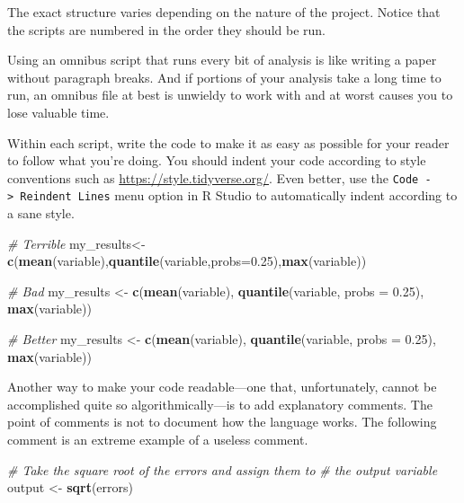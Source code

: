 \documentclass[
  12pt,
  oneside,openany]{book}
\newenvironment{Shaded}{\begin{snugshade}}{\end{snugshade}}
\newcommand{\CommentTok}[1]{\textcolor[rgb]{0.56,0.35,0.01}{\textit{#1}}}
\newcommand{\DataTypeTok}[1]{\textcolor[rgb]{0.13,0.29,0.53}{#1}}
\newcommand{\FloatTok}[1]{\textcolor[rgb]{0.00,0.00,0.81}{#1}}
\newcommand{\KeywordTok}[1]{\textcolor[rgb]{0.13,0.29,0.53}{\textbf{#1}}}
\newcommand{\NormalTok}[1]{#1}
\newcommand{\StringTok}[1]{\textcolor[rgb]{0.31,0.60,0.02}{#1}}
\begin{document}
The exact structure varies depending on the nature of the project. Notice that the scripts are numbered in the order they should be run.

Using an omnibus script that runs every bit of analysis is like writing a paper without paragraph breaks. And if portions of your analysis take a long time to run, an omnibus file at best is unwieldy to work with and at worst causes you to lose valuable time.

Within each script, write the code to make it as easy as possible for your reader to follow what you're doing. You should indent your code according to style conventions such as \url{https://style.tidyverse.org/}. Even better, use the \texttt{Code\ -\textgreater{}\ Reindent\ Lines} menu option in R Studio to automatically indent according to a sane style.

\begin{Shaded}
\begin{Highlighting}[]
\CommentTok{\# Terrible}
\NormalTok{my\_results\textless{}{-}}\KeywordTok{c}\NormalTok{(}\KeywordTok{mean}\NormalTok{(variable),}\KeywordTok{quantile}\NormalTok{(variable,}\DataTypeTok{probs=}\FloatTok{0.25}\NormalTok{),}\KeywordTok{max}\NormalTok{(variable))}

\CommentTok{\# Bad}
\NormalTok{my\_results \textless{}{-}}\StringTok{ }\KeywordTok{c}\NormalTok{(}\KeywordTok{mean}\NormalTok{(variable),}
\KeywordTok{quantile}\NormalTok{(variable,}
\DataTypeTok{probs =} \FloatTok{0.25}\NormalTok{),}
\KeywordTok{max}\NormalTok{(variable))}

\CommentTok{\# Better}
\NormalTok{my\_results \textless{}{-}}\StringTok{ }\KeywordTok{c}\NormalTok{(}\KeywordTok{mean}\NormalTok{(variable),}
                \KeywordTok{quantile}\NormalTok{(variable,}
                         \DataTypeTok{probs =} \FloatTok{0.25}\NormalTok{),}
                \KeywordTok{max}\NormalTok{(variable))}
\end{Highlighting}
\end{Shaded}

Another way to make your code readable---one that, unfortunately, cannot be accomplished quite so algorithmically---is to add explanatory comments. The point of comments is not to document how the language works. The following comment is an extreme example of a useless comment.

\begin{Shaded}
\begin{Highlighting}[]
\CommentTok{\# Take the square root of the errors and assign them to}
\CommentTok{\# the output variable}
\NormalTok{output \textless{}{-}}\StringTok{ }\KeywordTok{sqrt}\NormalTok{(errors)}
\end{Highlighting}
\end{Shaded}
\end{document}
